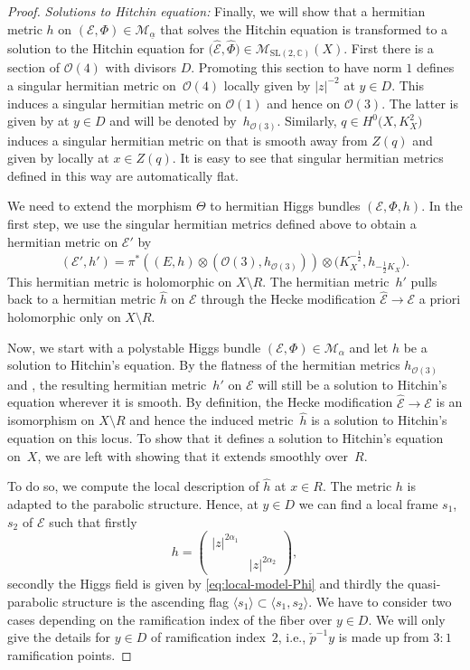 \documentclass[10pt,a4paper]{amsart}
\numberwithin{equation}{section}
\theoremstyle{definition}
\renewcommand{\to}{\rightarrow}
\newcommand{\ualpha}{\underline{\alpha}}
\newcommand{\calE}{\mathcal{E}}
\newcommand{\calM}{\mathcal{M}}
\newcommand{\calO}{\mathcal{O}}
\newcommand{\CC}{\mathbb{C}}
\newcommand{\SL}{\mathrm{SL}}
\begin{document}
\begin{proof}
 \textit{Solutions to Hitchin equation:} Finally, we will show that a hermitian metric $h$ on ${(\calE,\Phi) \in \calM_{\ualpha}}$ that solves the Hitchin equation is transformed to a solution to the Hitchin equation for $\bigl(\hat{\calE},\hat{\Phi}\bigr) \in \calM_{\SL(2,\CC)}(X)$. First there is a section of $\calO(4)$ with divisors $D$. Promoting this section to have norm $1$ defines a singular hermitian metric on~$\calO(4)$ locally given by $\vert z \vert^{-2}$ at $y \in D$. This induces a singular hermitian metric on $\calO(1)$ and hence on $\calO(3)$. The latter is given by  at $y \in D$ and will be denoted by~$h_{\calO(3)}$. Similarly, $q \in H^0\bigl(X,K_X^2\bigr)$ induces a singular hermitian metric  on  that is smooth away from $Z(q)$ and given by  locally at $x \in Z(q)$. It is easy to see that singular hermitian metrics defined in this way are automatically flat.

 We need to extend the morphism $\Theta$ to hermitian Higgs bundles $(\calE,\Phi,h)$. In the first step, we use the singular hermitian metrics defined above to obtain a hermitian metric on $\calE'$ by
 \[ (\calE',h')=\pi^* ((E,h) \otimes (\calO(3),h_{\calO(3)}) ) \otimes \bigl(K_X^{-\frac12},h_{-\frac12 K_X}\bigr).
 \]
 This hermitian metric is holomorphic on $X\setminus R$. The hermitian metric~$h'$ pulls back to a hermitian metric $\hat{h}$ on $\calE$ through the Hecke modification $\hat{\calE} \to \calE$ a priori holomorphic only on $X \setminus R$.

 Now, we start with a polystable Higgs bundle $(\calE,\Phi) \in \calM_{\alpha}$ and let $h$ be a solution to Hitchin's equation. By the flatness of the hermitian metrics $h_{\calO(3)}$ and , the resulting hermitian metric~$h'$ on $\calE$ will still be a solution to Hitchin's equation wherever it is smooth. By definition, the Hecke modification $\hat{\calE} \to \calE$ is an isomorphism on $X \setminus R$ and hence the induced metric~$\hat{h}$ is a solution to Hitchin's equation on this locus. To show that it defines a solution to Hitchin's equation on~$X$, we are left with showing that it extends smoothly over~$R$.

 To do so, we compute the local description of $\hat{h}$ at $x \in R$. The metric $h$ is adapted to the parabolic structure. Hence, at $y \in D$ we can find a local frame $s_1$, $s_2$ of $\calE$ such that firstly
 \[ h= \begin{pmatrix} \vert z \vert^{2\alpha_1} & \\ & \vert z \vert^{2\alpha_2} \end{pmatrix},
 \]
 secondly the Higgs field is given by \eqref{eq:local-model-Phi} and thirdly the quasi-parabolic structure is the ascending flag $\langle s_1 \rangle \subset \langle s_1,s_2 \rangle$. We have to consider two cases depending on the ramification index of the fiber over $y \in D$. We will only give the details for $y \in D$ of ramification index~$2$, i.e., $\check{p}^{-1}y$ is made up from $3:1$ ramification points.


\end{proof}
\end{document}
